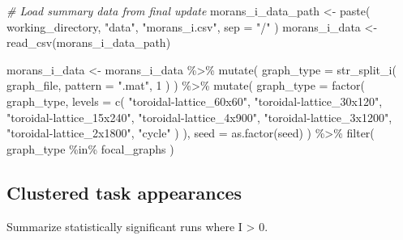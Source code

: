 \documentclass[
]{book}
\newenvironment{Shaded}{\begin{snugshade}}{\end{snugshade}}
\newcommand{\AttributeTok}[1]{\textcolor[rgb]{0.77,0.63,0.00}{#1}}
\newcommand{\CommentTok}[1]{\textcolor[rgb]{0.56,0.35,0.01}{\textit{#1}}}
\newcommand{\DecValTok}[1]{\textcolor[rgb]{0.00,0.00,0.81}{#1}}
\newcommand{\FunctionTok}[1]{\textcolor[rgb]{0.00,0.00,0.00}{#1}}
\newcommand{\NormalTok}[1]{#1}
\newcommand{\OtherTok}[1]{\textcolor[rgb]{0.56,0.35,0.01}{#1}}
\newcommand{\SpecialCharTok}[1]{\textcolor[rgb]{0.00,0.00,0.00}{#1}}
\newcommand{\StringTok}[1]{\textcolor[rgb]{0.31,0.60,0.02}{#1}}
\begin{document}
\begin{Shaded}
\begin{Highlighting}[]
\CommentTok{\# Load summary data from final update}
\NormalTok{morans\_i\_data\_path }\OtherTok{\textless{}{-}} \FunctionTok{paste}\NormalTok{(}
\NormalTok{  working\_directory,}
  \StringTok{"data"}\NormalTok{,}
  \StringTok{"morans\_i.csv"}\NormalTok{,}
  \AttributeTok{sep =} \StringTok{"/"}
\NormalTok{)}
\NormalTok{morans\_i\_data }\OtherTok{\textless{}{-}} \FunctionTok{read\_csv}\NormalTok{(morans\_i\_data\_path)}

\NormalTok{morans\_i\_data }\OtherTok{\textless{}{-}}\NormalTok{ morans\_i\_data }\SpecialCharTok{\%\textgreater{}\%}
  \FunctionTok{mutate}\NormalTok{(}
    \AttributeTok{graph\_type =} \FunctionTok{str\_split\_i}\NormalTok{(}
\NormalTok{      graph\_file,}
      \AttributeTok{pattern =} \StringTok{".mat"}\NormalTok{,}
      \DecValTok{1}
\NormalTok{    )}
\NormalTok{  ) }\SpecialCharTok{\%\textgreater{}\%}
  \FunctionTok{mutate}\NormalTok{(}
    \AttributeTok{graph\_type =} \FunctionTok{factor}\NormalTok{(}
\NormalTok{      graph\_type,}
      \AttributeTok{levels =} \FunctionTok{c}\NormalTok{(}
        \StringTok{"toroidal{-}lattice\_60x60"}\NormalTok{,}
        \StringTok{"toroidal{-}lattice\_30x120"}\NormalTok{,}
        \StringTok{"toroidal{-}lattice\_15x240"}\NormalTok{,}
        \StringTok{"toroidal{-}lattice\_4x900"}\NormalTok{,}
        \StringTok{"toroidal{-}lattice\_3x1200"}\NormalTok{,}
        \StringTok{"toroidal{-}lattice\_2x1800"}\NormalTok{,}
        \StringTok{"cycle"}
\NormalTok{      )}
\NormalTok{    ),}
    \AttributeTok{seed =} \FunctionTok{as.factor}\NormalTok{(seed)}
\NormalTok{  ) }\SpecialCharTok{\%\textgreater{}\%}
  \FunctionTok{filter}\NormalTok{(}
\NormalTok{    graph\_type }\SpecialCharTok{\%in\%}\NormalTok{ focal\_graphs}
\NormalTok{  )}
\end{Highlighting}
\end{Shaded}

\hypertarget{clustered-task-appearances}{%
\subsection{Clustered task appearances}\label{clustered-task-appearances}}

Summarize statistically significant runs where I \textgreater{} 0.
\end{document}
